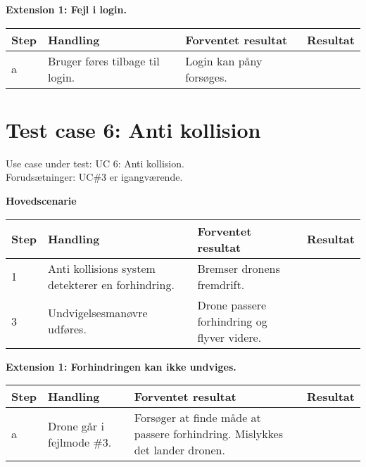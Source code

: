 \textbf{Extension 1: Fejl i login.}
\begin{table}[H]
	\centering
		\begin{tabular}{|l|p{5 cm}|p{5 cm}|p{3.5 cm}|} 
		\hline
			Step & Handling & Forventet resultat & Resultat\\ \hline
			a & Bruger føres tilbage til login. & Login kan påny forsøges. & \\ \hline
		\end{tabular}
\end{table}

\section{Test case 6: Anti kollision}
Use case under test: UC 6: Anti kollision.\\
Forudsætninger:	UC\#3 er igangværende.

\textbf{Hovedscenarie}
\begin{table}[H]
	\centering
		\begin{tabular}{|l|p{5 cm}|p{5 cm}|p{3.5 cm}|} 
		\hline
			Step & Handling & Forventet resultat & Resultat\\ \hline
			1 & Anti kollisions system \newline detekterer en forhindring. & Bremser dronens fremdrift. &  \\ \hline
			3 & Undvigelsesmanøvre udføres. & Drone passere forhindring og flyver videre. & \\ \hline			
		\end{tabular}
\end{table}

\textbf{Extension 1: Forhindringen kan ikke undviges.}
\begin{table}[H]
	\centering
		\begin{tabular}{|l|p{5 cm}|p{5 cm}|p{3.5 cm}|} 
		\hline
			Step & Handling & Forventet resultat & Resultat\\ \hline
			a & Drone går i fejlmode \#3. & Forsøger at finde måde at passere forhindring. Mislykkes det lander dronen. & \\ \hline
		\end{tabular}
\end{table}


